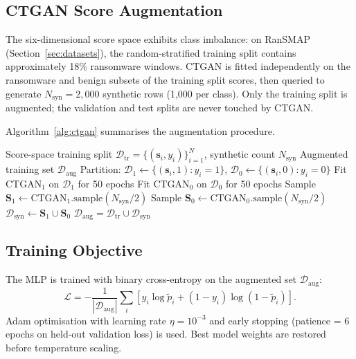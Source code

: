 \documentclass[journal]{IEEEtran}
\newcommand{\pfused}{\tilde{p}}
\newcommand{\Nsynth}{N_{\mathrm{syn}}}
\begin{document}
\subsection{CTGAN Score Augmentation}

The six-dimensional score space exhibits class imbalance: on RanSMAP
(Section~\ref{sec:datasets}), the random-stratified training split
contains approximately 18\% ransomware windows.
CTGAN \cite{xu_ctgan_2019} is fitted independently on the ransomware and
benign subsets of the training split scores, then queried to generate
$\Nsynth = 2{,}000$ synthetic rows (1,000 per class).
Only the training split is augmented; the validation and test splits
are never touched by CTGAN.

Algorithm~\ref{alg:ctgan} summarises the augmentation procedure.

\begin{algorithm}[t]
\caption{CTGAN score-space augmentation for Decision MLP training}
\label{alg:ctgan}
\begin{algorithmic}[1]
\Require Score-space training split $\mathcal{D}_{\mathrm{tr}} = \{(\mathbf{s}_i, y_i)\}_{i=1}^{N}$,
         synthetic count $\Nsynth$
\Ensure Augmented training set $\mathcal{D}_{\mathrm{aug}}$
\State Partition: $\mathcal{D}_1 \gets \{(\mathbf{s}_i, 1) : y_i=1\}$,
                  $\mathcal{D}_0 \gets \{(\mathbf{s}_i, 0) : y_i=0\}$
\State Fit $\mathrm{CTGAN}_1$ on $\mathcal{D}_1$ for 50 epochs
\State Fit $\mathrm{CTGAN}_0$ on $\mathcal{D}_0$ for 50 epochs
\State Sample $\mathbf{S}_1 \gets \mathrm{CTGAN}_1.\mathrm{sample}(\Nsynth / 2)$
\State Sample $\mathbf{S}_0 \gets \mathrm{CTGAN}_0.\mathrm{sample}(\Nsynth / 2)$
\State $\mathcal{D}_{\mathrm{syn}} \gets \mathbf{S}_1 \cup \mathbf{S}_0$
\State \Return $\mathcal{D}_{\mathrm{aug}} = \mathcal{D}_{\mathrm{tr}} \cup \mathcal{D}_{\mathrm{syn}}$
\end{algorithmic}
\end{algorithm}

\subsection{Training Objective}

The MLP is trained with binary cross-entropy on the augmented set
$\mathcal{D}_{\mathrm{aug}}$:
\begin{equation}
  \mathcal{L} = -\frac{1}{|\mathcal{D}_{\mathrm{aug}}|}
  \sum_{i} \left[
    y_i \log \pfused_i + (1 - y_i) \log (1 - \pfused_i)
  \right].
\end{equation}
Adam optimisation with learning rate $\eta = 10^{-3}$ and early stopping
(patience = 6 epochs on held-out validation loss) is used.
Best model weights are restored before temperature scaling.
\end{document}
